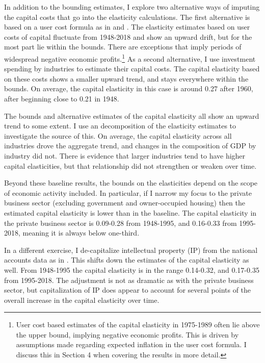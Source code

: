 \documentclass[11pt]{article}
\begin{document}
In addition to the bounding estimates, I explore two alternative ways of imputing the capital costs that go into the elasticity calculations. The first alternative is based on a user cost formula \citep{halljorg1967} as in \cite{Barkai000} and \cite{rognlie2015}. The elasticity estimates based on user costs of capital fluctuate from 1948-2018 and show an upward drift, but for the most part lie within the bounds. There are exceptions that imply periods of widespread negative economic profits.\footnote{User cost based estimates of the capital elasticity in 1975-1989 often lie above the upper bound, implying negative economic profits. This is driven by assumptions made regarding expected inflation in the user cost formula. I discuss this in Section 4 when covering the results in more detail.} As a second alternative, I use investment spending by industries to estimate their capital costs. The capital elasticity based on these costs shows a smaller upward trend, and stays everywhere within the bounds. On average, the capital elasticity in this case is around 0.27 after 1960, after beginning close to 0.21 in 1948. 

The bounds and alternative estimates of the capital elasticity all show an upward trend to some extent. I use an \cite{op1996} decomposition of the elasticity estimates to investigate the source of this. On average, the capital elasticity across all industries drove the aggregate trend, and changes in the composition of GDP by industry did not. There is evidence that larger industries tend to have higher capital elasticities, but that relationship did not strengthen or weaken over time.

Beyond these baseline results, the bounds on the elasticities depend on the scope of economic activity included. In particular, if I narrow my focus to the private business sector (excluding government and owner-occupied housing) then the estimated capital elasticity is lower than in the baseline. The capital elasticity in the private business sector is 0.09-0.28 from 1948-1995, and 0.16-0.33 from 1995-2018, meaning it is always below one-third. 

In a different exercise, I de-capitalize intellectual property (IP) from the national accounts data as in \cite{ksz2020}. This shifts down the estimates of the capital elasticity as well. From 1948-1995 the capital elasticity is in the range 0.14-0.32, and 0.17-0.35 from 1995-2018. The adjustment is not as dramatic as with the private business sector, but capitalization of IP does appear to account for several points of the overall increase in the capital elasticity over time. 
\end{document}
